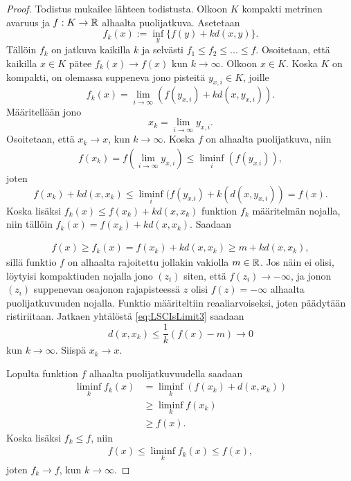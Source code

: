\documentclass[12pt,oneside,a4paper]{amsbook} %
\begin{document}
\begin{proof}
    Todistus mukailee lähteen \cite[s. 30]{optimal} todistusta. Olkoon $K$ kompakti metrinen avaruus ja $f:K \to \mathbb{R}$ alhaalta puolijatkuva. Asetetaan $$f_k(x) := \inf_y\{f(y) + kd(x,y)\}.$$ Tällöin $f_k$ on jatkuva kaikilla $k$ ja selvästi $f_1 \le f_2 \le ... \le f$. Osoitetaan, että kaikilla $x\in K$ pätee $f_k(x) \to f(x)$ kun $k \to \infty$. 
    Olkoon $x\in K$. Koska $K$ on kompakti, on olemassa suppeneva jono pisteitä $y_{x,i} \in K$, joille
    \begin{equation*}
        f_k(x) = \lim_{i \to \infty}(f(y_{x,i}) + k d(x, y_{x,i})).
    \end{equation*}
    Määritellään jono 
    \begin{equation*}
        x_k = \lim_{i\to \infty} y_{x,i}.
    \end{equation*}
    Osoitetaan, että $x_k \to x$, kun $k \to \infty$. Koska $f$ on alhaalta puolijatkuva, niin 
    \begin{align*}
        f(x_k) = f\left(\lim_{i\to \infty} y_{x,i}\right) \le \liminf_i (f(y_{x.i})),
    \end{align*}
    joten 
    \begin{equation*}
        f(x_k) + k d(x, x_k) \le \liminf_i (f(y_{x.i}) + k(d(x,y_{x,i})) = f(x).
    \end{equation*}
    Koska lisäksi $f_k(x) \le f(x_k) + kd(x, x_k)$ funktion $f_k$ määritelmän nojalla, niin tällöin $f_k(x) = f(x_k) + kd(x,x_k)$. Saadaan
    
    \begin{align}\label{eq:LSCIsLimit3}
        f(x) \ge f_k(x) = f(x_k) + kd(x, x_k) \ge m + k d(x, x_k),
    \end{align}
    sillä funktio $f$ on alhaalta rajoitettu jollakin vakiolla $m \in \mathbb{R}$. Jos näin ei olisi, löytyisi kompaktiuden nojalla jono $(z_i)$ siten, että $f(z_i) \to -\infty$, ja jonon $(z_i)$ suppenevan osajonon rajapisteessä $z$ olisi $f(z) = -\infty$ alhaalta puolijatkuvuuden nojalla. Funktio määriteltiin reaaliarvoiseksi, joten päädytään ristiriitaan. Jatkaen yhtälöstä \eqref{eq:LSCIsLimit3} saadaan 
    \begin{equation*}%
        d(x, x_k) \le \frac{1}{k}(f(x) - m) \to 0
    \end{equation*}
    kun $k \to \infty$. Siispä $x_k \to x$.
    
    Lopulta funktion $f$ alhaalta puolijatkuvuudella saadaan
    \begin{align*}
        \liminf_k f_k(x) &= \liminf_k (f(x_k) + d(x,x_k)) \\
        &\ge \liminf_k f(x_k) \\
        & \ge f(x).
    \end{align*}
    Koska lisäksi $f_k \le f$, niin
    \begin{align*}
        f(x) \le \liminf_k f_k(x) \le f(x),
    \end{align*}
    joten $f_k \to f$, kun $k \to \infty$.
\end{proof}
\end{document}
